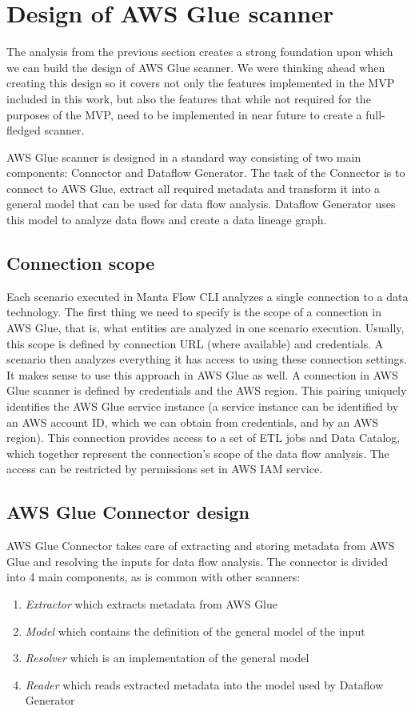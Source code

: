 \section{Design of AWS Glue scanner}

The analysis from the previous section creates a strong foundation upon which we can build the design of AWS Glue scanner. We were thinking ahead when creating this design so it covers not only the features implemented in the MVP included in this work, but also the features that while not required for the purposes of the MVP, need to be implemented in near future to create a full-fledged scanner.
\par
AWS Glue scanner is designed in a standard way consisting of two main components: Connector and Dataflow Generator. The task of the Connector is to connect to AWS Glue, extract all required metadata and transform it into a general model that can be used for data flow analysis. Dataflow Generator uses this model to analyze data flows and create a data lineage graph. 

\subsection{Connection scope}
Each scenario executed in Manta Flow CLI analyzes a single connection to a data technology. The first thing we need to specify is the scope of a connection in AWS Glue, that is, what entities are analyzed in one scenario execution. Usually, this scope is defined by connection URL (where available) and credentials. A scenario then analyzes everything it has access to using these connection settings. It makes sense to use this approach in AWS Glue as well. A connection in AWS Glue scanner is defined by credentials and the AWS region. This pairing uniquely identifies the AWS Glue service instance (a service instance can be identified by an AWS account ID, which we can obtain from credentials, and by an AWS region). This connection provides access to a set of ETL jobs and Data Catalog, which together represent the connection's scope of the data flow analysis. The access can be restricted by permissions set in AWS IAM service.

\subsection{AWS Glue Connector design}
AWS Glue Connector takes care of extracting and storing metadata from AWS Glue and resolving the inputs for data flow analysis. The connector is divided into 4 main components, as is common with other scanners:
\begin{enumerate}
    \item \textit{Extractor} which extracts metadata from AWS Glue
    \item \textit{Model} which contains the definition of the general model of the input
    \item \textit{Resolver} which is an implementation of the general model
    \item \textit{Reader} which reads extracted metadata into the model used by Dataflow Generator
\end{enumerate}

